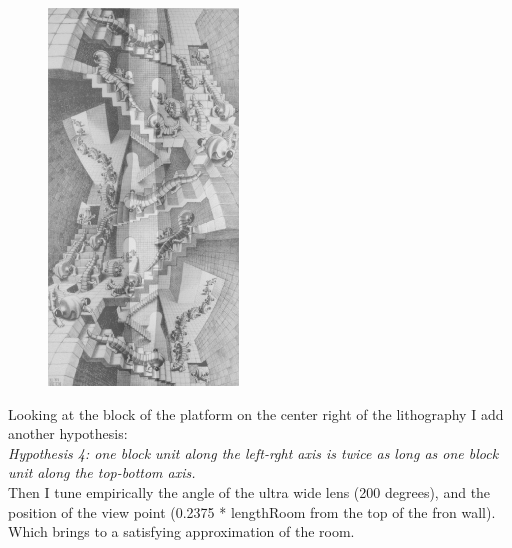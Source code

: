 \documentclass[12pt, a4paper]{article}
\begin{document}
\begin{center}
\begin{figure}[H]
\centering\includegraphics[height=10cm]{./checkDimensionViewPoint_1.png}\\
\end{figure}
\end{center}

Looking at the block of the platform on the center right of the lithography I add another hypothesis:\\

\emph{Hypothesis 4: one block unit along the left-rght axis is twice as long as one block unit along the top-bottom axis.}\\

Then I tune empirically the angle of the ultra wide lens (200 degrees), and the position of the view point (0.2375 * lengthRoom from the top of the fron wall). Which brings to a satisfying approximation of the room.\\

\begin{scriptsize}
\begin{ttfamily}

\end{ttfamily}
\end{scriptsize}
\end{document}
